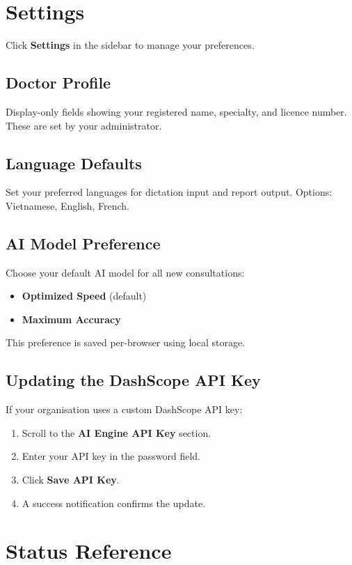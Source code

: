 \documentclass[12pt,a4paper]{article}
\begin{document}
\section{Settings}

Click \textbf{Settings} in the sidebar to manage your preferences.

\subsection{Doctor Profile}
Display-only fields showing your registered name, specialty, and licence number.
These are set by your administrator.

\subsection{Language Defaults}
Set your preferred languages for dictation input and report output.
Options: Vietnamese, English, French.

\subsection{AI Model Preference}
Choose your default AI model for all new consultations:
\begin{itemize}
	\item \textbf{Optimized Speed} (default)
	\item \textbf{Maximum Accuracy}
\end{itemize}
This preference is saved per-browser using local storage.

\subsection{Updating the DashScope API Key}
If your organisation uses a custom DashScope API key:
\begin{enumerate}
	\item Scroll to the \textbf{AI Engine API Key} section.
	\item Enter your API key in the password field.
	\item Click \textbf{Save API Key}.
	\item A success notification confirms the update.
\end{enumerate}

\section{Status Reference}
\end{document}
